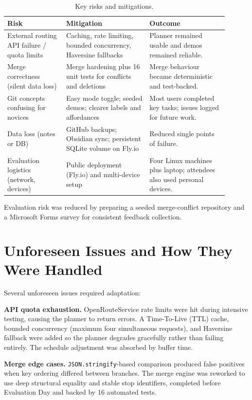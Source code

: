 \documentclass[pdftex,11pt,a4paper,oneside]{article}
\begin{document}
\begin{table}[H]
\centering
\caption{Key risks and mitigations.}
\label{tab:risk}
\begin{tabular}{@{}p{0.24\linewidth}p{0.34\linewidth}p{0.32\linewidth}@{}}
\toprule
\textbf{Risk} & \textbf{Mitigation} & \textbf{Outcome} \\
\midrule
External routing API failure / quota limits
  & Caching, rate limiting, bounded concurrency, Haversine fallbacks
  & Planner remained usable and demos remained reliable. \\
\midrule
Merge correctness (silent data loss)
  & Merge hardening plus 16 unit tests for conflicts and deletions
  & Merge behaviour became deterministic and test-backed. \\
\midrule
Git concepts confusing for novices
  & Easy mode toggle; seeded demos; clearer labels and affordances
  & Most users completed key tasks; issues logged for future work. \\
\midrule
Data loss (notes or DB)
  & GitHub backups; Obsidian sync; persistent SQLite volume on Fly.io
  & Reduced single points of failure. \\
\midrule
Evaluation logistics (network, devices)
  & Public deployment (Fly.io) and multi-device setup
  & Four Linux machines plus laptop; attendees also used personal devices. \\
\bottomrule
\end{tabular}
\end{table}

Evaluation risk was reduced by preparing a seeded merge-conflict repository and a Microsoft Forms survey for consistent feedback collection.

\section{Unforeseen Issues and How They Were Handled}
Several unforeseen issues required adaptation:

\textbf{API quota exhaustion.} OpenRouteService rate limits were hit during intensive testing, causing the planner to return errors. A Time-To-Live (TTL) cache, bounded concurrency (maximum four simultaneous requests), and Haversine fallback were added so the planner degrades gracefully rather than failing entirely. The schedule adjustment was absorbed by buffer time.

\textbf{Merge edge cases.} \texttt{JSON.stringify}-based comparison produced false positives when key ordering differed between branches. The merge engine was reworked to use deep structural equality and stable stop identifiers, completed before Evaluation Day and backed by 16 automated tests.
\end{document}
